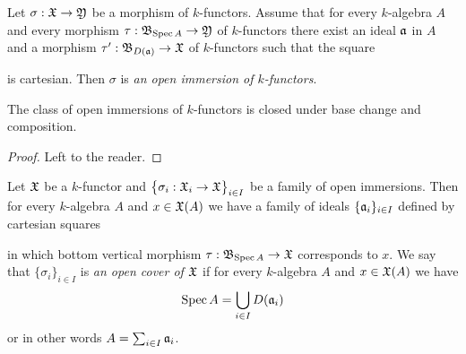 \begin{definition}
Let $\sigma:{\mathfrak X}\rightarrow {\mathfrak Y}$ be a morphism of $k$-functors. Assume that for every $k$-algebra $A$ and every morphism $\tau:{\mathfrak B}_{\mathrm{Spec}\, A}\rightarrow {\mathfrak Y}$ of $k$-functors there exist an ideal $\mathfrak{a}$ in $A$ and a morphism $\tau':{\mathfrak B}_{D(\mathfrak{a})}\rightarrow {\mathfrak X}$ of $k$-functors such that the square
\begin{center}
\end{center}
is cartesian. Then $\sigma$ is \textit{an open immersion of $k$-functors}.
\end{definition}

\begin{fact}\label{fact:openimmersionsclosedunderbasechangeandcomposition}
The class of open immersions of $k$-functors is closed under base change and composition.
\end{fact}
\begin{proof}
Left to the reader.
\end{proof}

\begin{definition}
Let ${\mathfrak X}$ be a $k$-functor and $\big\{\sigma_i:{\mathfrak X}_i\rightarrow {\mathfrak X}\big\}_{i\in I}$ be a family of open immersions. Then for every $k$-algebra $A$ and $x\in {\mathfrak X}(A)$ we have a family of ideals $\{\mathfrak{a}_i\}_{i\in I}$ defined by cartesian squares
\begin{center}
\end{center}
in which bottom vertical morphism $\tau:{\mathfrak B}_{\mathrm{Spec}\, A}\rightarrow {\mathfrak X}$ corresponds to $x$. We say that $\{\sigma_i\}_{i\in I}$ is \textit{an open cover of ${\mathfrak X}$} if for every $k$-algebra $A$ and $x\in {\mathfrak X}(A)$ we have
$$\mathrm{Spec}\, A = \bigcup_{i\in I}D(\mathfrak{a}_i)$$
or in other words $A = \sum_{i\in I}\mathfrak{a}_i$.
\end{definition}

